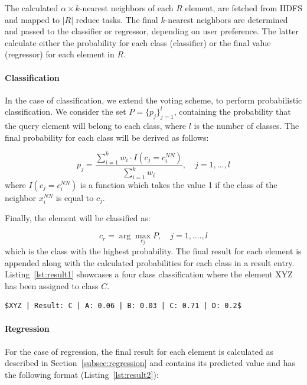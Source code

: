 \label{par:algorithmic3}
The calculated  $\alpha \times k$-nearest neighbors of each $R$ element, are fetched from HDFS and mapped to $|R|$ reduce tasks. The final $k$-nearest neighbors are determined and passed to the classifier or regressor, depending on user preference. The latter calculate either the probability for each class (classifier) or the final value (regressor) for each element in $R$.

\paragraph{Classification} In the case of classification, we extend the voting scheme, to perform probabilistic classification. We consider the set $P = \{p_{j}\}_{j=1}^{l}$, containing the probability that the query element will belong to each class, where $l$ is the number of classes. The final probability for each class will be derived as follows:

\begin{equation}
	p_{j} = \frac{\sum_{i=1}^{k} w_{i} \cdot I(c_{j} = c_{i}^{NN})}{\sum_{i=1}^{k} w_{i}}, \quad j=1, ..., l
\end{equation}
where $I(c_{j} = c_{i}^{NN})$ is a function which takes the value 1 if the class of the neighbor $x_{i}^{NN}$ is equal to $c_{j}$. 

Finally, the element will be classified as:

\begin{equation} 
	c_{r} = \arg \max_{c_{j}} P, \quad j=1, ...., l
\end{equation}
which is the class with the highest probability. The final result for each element is appended along with the calculated probabilities for each class in a result entry. Listing~\ref{lst:result1} showcases a four class classification where the element XYZ has been assigned to class $C$.

\begin{lstlisting}[caption={The element XYZ is classified to class C, which has the highest probability.}, label={lst:result1}, mathescape=true]
$XYZ | Result: C | A: 0.06 | B: 0.03 | C: 0.71 | D: 0.2$
\end{lstlisting}

\paragraph{Regression} For the case of regression, the final result for each element is calculated as described in Section~\ref{subsec:regression} and contains its predicted value and has the following format (Listing~\ref{lst:result2}):

